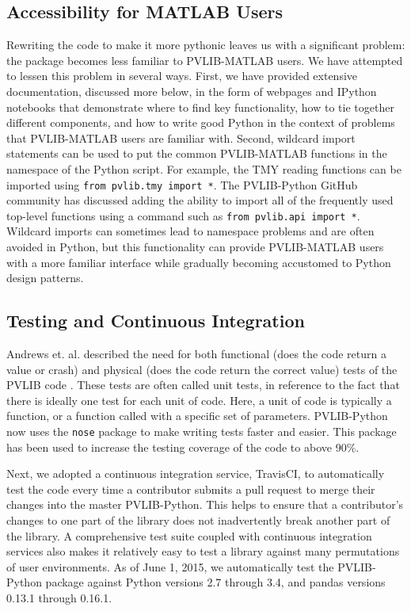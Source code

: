 \documentclass[conference]{IEEEtran}
\begin{document}
\subsection{Accessibility for MATLAB Users}
Rewriting the code to make it more pythonic leaves us with a significant problem: the package becomes less familiar to PVLIB-MATLAB users. 
We have attempted to lessen this problem in several ways.
First, we have provided extensive documentation, discussed more below, in the form of webpages and IPython notebooks that demonstrate where to find key functionality, how to tie together different components, and how to write good Python in the context of problems that PVLIB-MATLAB users are familiar with.
Second, wildcard import statements can be used to put the common PVLIB-MATLAB functions in the namespace of the Python script. 
For example, the TMY reading functions can be imported using \texttt{from pvlib.tmy import *}.
The PVLIB-Python GitHub community has discussed adding the ability to import all of the frequently used top-level functions using a command such as \texttt{from pvlib.api import *}.
Wildcard imports can sometimes lead to namespace problems and are often avoided in Python, but this functionality can provide PVLIB-MATLAB users with a more familiar interface while gradually becoming accustomed to Python design patterns.

\subsection{Testing and Continuous Integration}

Andrews et. al. described the need for both functional (does the code return a value or crash) and physical (does the code return the correct value) tests of the PVLIB code \cite{andrews}.
These tests are often called unit tests, in reference to the fact that there is ideally one test for each unit of code.
Here, a unit of code is typically a function, or a function called with a specific set of parameters.
PVLIB-Python now uses the \texttt{nose} package \cite{nosetests} to make writing tests faster and easier.
This package has been used to increase the testing coverage of the code to above 90\%.

Next, we adopted a continuous integration service, TravisCI, to automatically test the code every time a contributor submits a pull request to merge their changes into the master PVLIB-Python.
This helps to ensure that a contributor's changes to one part of the library does not inadvertently break another part of the library.
A comprehensive test suite coupled with continuous integration services also makes it relatively easy to test a library against many permutations of user environments.
As of June 1, 2015, we automatically test the PVLIB-Python package against Python versions 2.7 through 3.4, and pandas versions 0.13.1 through 0.16.1.
\end{document}
